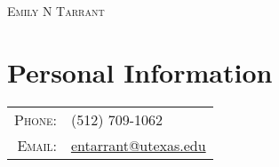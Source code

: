 \documentclass[a4paper,10pt]{article}
\begin{document}
\pagestyle{empty} %

\par{\centering
  {\textsc{Emily N Tarrant}
}\bigskip\par}

\section{Personal Information}

\begin{tabular}{rl}
  \textsc{Phone:}     		& (512) 709-1062 \\
  \textsc{Email:}     		& \href{mailto:entarrant@utexas.edu}{entarrant@utexas.edu} \\
\end{tabular}

\end{document}
